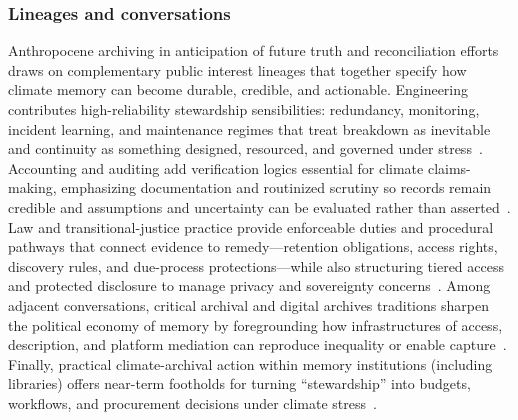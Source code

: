 \documentclass[acmsmall,screen]{acmart}
\begin{document}
\subsubsection*{Lineages and conversations}
Anthropocene archiving in anticipation of future truth and reconciliation efforts draws on complementary public interest lineages that together specify how climate memory can become durable, credible, and actionable. Engineering contributes high-reliability stewardship sensibilities: redundancy, monitoring, incident learning, and maintenance regimes that treat breakdown as inevitable and continuity as something designed, resourced, and governed under stress~\cite{wessellKeepingArchivesWater2023,mazurczykAmericanArchivesClimate2018}. Accounting and auditing add verification logics essential for climate claims-making, emphasizing documentation and routinized scrutiny so records remain credible and assumptions and uncertainty can be evaluated rather than asserted~\cite{paschalidouStrongSustainabilityFramework2022a,orrClimateChangeCultural2021}. Law and transitional-justice practice provide enforceable duties and procedural pathways that connect evidence to remedy---retention obligations, access rights, discovery rules, and due-process protections---while also structuring tiered access and protected disclosure to manage privacy and sovereignty concerns~\cite{robinson-sweetTruthReconciliationArchivists2018,ghaddarSpectreArchiveTruth2016}. Among adjacent conversations, critical archival and digital archives traditions sharpen the political economy of memory by foregrounding how infrastructures of access, description, and platform mediation can reproduce inequality or enable capture~\cite{carbajalCriticalDigitalArchives2021a,woodMobilizingRecordsReframing2014}. Finally, practical climate-archival action within memory institutions (including libraries) offers near-term footholds for turning ``stewardship'' into budgets, workflows, and procurement decisions under climate stress~\cite{ajaniLibrariesClimateChange2025,robinsonComeHellHigh2021}.
\end{document}

